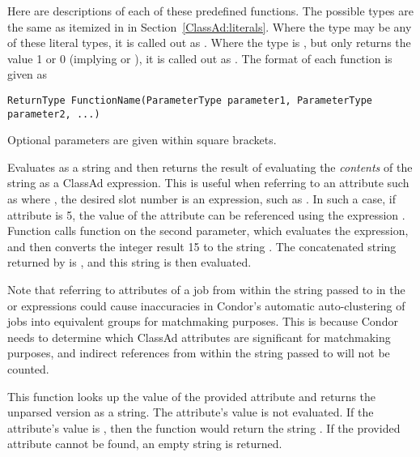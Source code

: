 Here are descriptions of each of these predefined functions.
The possible types are the same as itemized in 
in Section~\ref{ClassAd:literals}.
Where the type may be any of these literal types, it is
called out as \verb@AnyType@.
Where the type is \verb@Integer@, but only returns
the value 1 or 0 (implying  or ),
it is called out as \verb@Boolean@.
The format of each function is given as

\footnotesize
\begin{verbatim}
ReturnType FunctionName(ParameterType parameter1, ParameterType parameter2, ...)
\end{verbatim}
\normalsize
Optional parameters are given within square brackets.

\begin{description}
  \item[\Code{AnyType eval(AnyType Expr)}]
  Evaluates  as a string and then returns the result of
  evaluating the \emph{contents} of the string as a ClassAd expression.
  This is useful when referring to an attribute such as 
  where , the desired slot number is an expression, such as
  .  
  In such a case, if attribute  is 5,
  the value of the attribute  can
  be referenced using the expression
  .
  Function  calls function 
  on the second parameter, which evaluates the expression,
  and then converts the integer result 15 to the string .
  The concatenated string returned by  is
  , and this string is then evaluated.

  Note that referring to attributes of a job from within the string
  passed to  in the  or
   expressions could cause inaccuracies in Condor's
  automatic auto-clustering of jobs into equivalent groups for
  matchmaking purposes.  This is because Condor needs to determine
  which ClassAd attributes are significant for matchmaking purposes,
  and indirect references from within the string passed to 
  will not be counted.

  \item[\Code{String unparse(Attribute attr)}]
  This function looks up the value of the provided attribute and returns
  the unparsed version as a string. The attribute's value is not evaluated.
  If the attribute's value is , then the function would return
  the string .
  If the provided attribute cannot be found, an empty string is returned.


\end{description}
